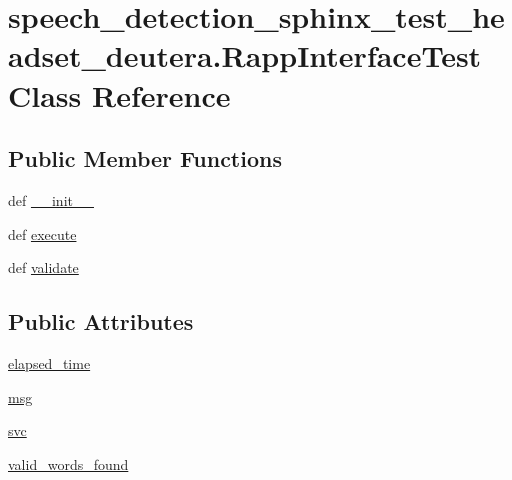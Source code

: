 \hypertarget{classspeech__detection__sphinx__test__headset__deutera_1_1RappInterfaceTest}{\section{speech\-\_\-detection\-\_\-sphinx\-\_\-test\-\_\-headset\-\_\-deutera.\-Rapp\-Interface\-Test Class Reference}
\label{classspeech__detection__sphinx__test__headset__deutera_1_1RappInterfaceTest}
}
\subsection*{Public Member Functions}
\begin{DoxyCompactItemize}
\item 
def \hyperlink{classspeech__detection__sphinx__test__headset__deutera_1_1RappInterfaceTest_a72c99134c54f9e16340d0a2c01d0a6c6}{\-\_\-\-\_\-init\-\_\-\-\_\-}
\item 
def \hyperlink{classspeech__detection__sphinx__test__headset__deutera_1_1RappInterfaceTest_a35f3d672f04cb2437d8d06201bd7dd97}{execute}
\item 
def \hyperlink{classspeech__detection__sphinx__test__headset__deutera_1_1RappInterfaceTest_a75aed35cf08ea7e2c025b565c4a4c19d}{validate}
\end{DoxyCompactItemize}
\subsection*{Public Attributes}
\begin{DoxyCompactItemize}
\item 
\hyperlink{classspeech__detection__sphinx__test__headset__deutera_1_1RappInterfaceTest_acb0f6d5f25a2a9fea216ee8996947bf0}{elapsed\-\_\-time}
\item 
\hyperlink{classspeech__detection__sphinx__test__headset__deutera_1_1RappInterfaceTest_ab5d6871c58a8e8bde31f192267a5bfe5}{msg}
\item 
\hyperlink{classspeech__detection__sphinx__test__headset__deutera_1_1RappInterfaceTest_af37c9955eed702b8e91befb68348295e}{svc}
\item 
\hyperlink{classspeech__detection__sphinx__test__headset__deutera_1_1RappInterfaceTest_a1c088592f7ee524c21da75f82e4b2aa7}{valid\-\_\-words\-\_\-found}
\end{DoxyCompactItemize}


